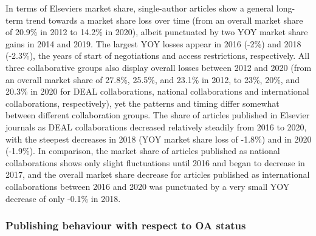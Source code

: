 \documentclass[
]{article}
\begin{document}
In terms of Elsevier\textquotesingle s market share, single-author articles show a general long-term trend towards a market share loss over time (from an overall market share of 20.9\% in 2012 to 14.2\% in 2020), albeit punctuated by two YOY market share gains in 2014 and 2019. The largest YOY losses appear in 2016 (-2\%) and 2018 (-2.3\%), the years of start of negotiations and access restrictions, respectively. All three collaborative groups also display overall losses between 2012 and 2020 (from an overall market share of 27.8\%, 25.5\%, and 23.1\% in 2012, to 23\%, 20\%, and 20.3\% in 2020 for DEAL collaborations, national collaborations and international collaborations, respectively), yet the patterns and timing differ somewhat between different collaboration groups. The share of articles published in Elsevier journals as DEAL collaborations decreased relatively steadily from 2016 to 2020, with the steepest decreases in 2018 (YOY market share loss of -1.8\%) and in 2020 (-1.9\%). In comparison, the market share of articles published as national collaborations shows only slight fluctuations until 2016 and began to decrease in 2017, and the overall market share decrease for articles published as international collaborations between 2016 and 2020 was punctuated by a very small YOY decrease of only -0.1\% in 2018.

\hypertarget{publishing-behaviour-with-respect-to-oa-status}{%
\subsubsection{Publishing behaviour with respect to OA status}\label{publishing-behaviour-with-respect-to-oa-status}}
\end{document}
